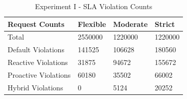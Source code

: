 \begin{table}
    \caption{Experiment I - SLA Violation Counts}\label{tab:exp1-sla-violation-count}
    \centering
    \begin{tabular}{|l|l|l|l|}
        \hline
        Request Counts & Flexible & Moderate & Strict \\
        \hline
        Total  & \num[group-separator={,}]{2550000} & \num[group-separator={,}]{1220000} & \num[group-separator={,}]{1220000} \\
        \hline
        Default Violations & \num[group-separator={,}]{141525} & \num[group-separator={,}]{106628} & \num[group-separator={,}]{180560} \\
        Reactive Violations & \num[group-separator={,}]{31875} & \num[group-separator={,}]{94672} & \num[group-separator={,}]{155672} \\
        Proactive Violations & \num[group-separator={,}]{60180} & \num[group-separator={,}]{35502} & \num[group-separator={,}]{66002} \\
        Hybrid Violations & \num[group-separator={,}]{0} & \num[group-separator={,}]{5124} & \num[group-separator={,}]{20252} \\
         \hline
    \end{tabular}
\end{table}

